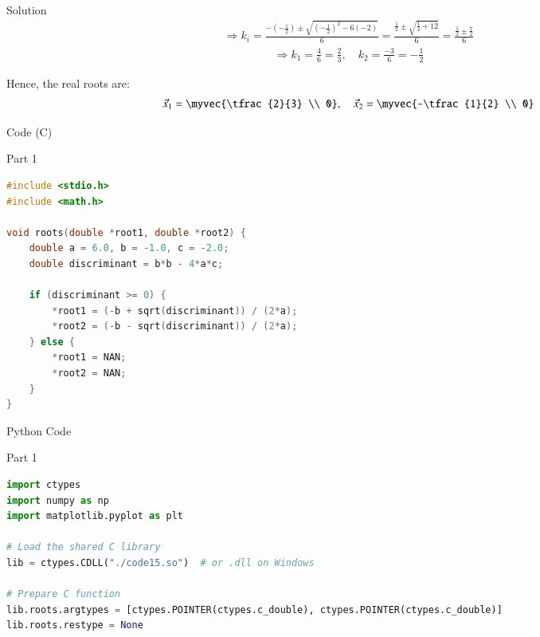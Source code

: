 \documentclass{beamer}
\begin{document}
\begin{frame}{Solution}
\begin{align}
\Rightarrow 
k_i = 
\frac{ -(-\tfrac{1}{2}) 
\pm \sqrt{ (-\tfrac{1}{2})^2 - 6(-2) } }{6}
= 
\frac{ \tfrac{1}{2} \pm \sqrt{ \tfrac{1}{4} + 12 } }{6}
= 
\frac{ \tfrac{1}{2} \pm \tfrac{7}{2} }{6}
\end{align}
\begin{align}
\Rightarrow 
k_1 = \frac{4}{6} = \frac{2}{3}, 
\quad 
k_2 = \frac{-3}{6} = -\frac{1}{2}
\end{align}

Hence, the real roots are:
\begin{align}
\vec{x}_1 = \myvec{\tfrac{2}{3} \\ 0}, 
\quad 
\vec{x}_2 = \myvec{-\tfrac{1}{2} \\ 0}
\end{align}
\end{frame}


\begin{frame}[fragile]{ Code (C)}
\begin{block}{Part 1}
\begin{lstlisting}[language=C, basicstyle=\ttfamily\small, keywordstyle=\color{blue}, frame=single]
#include <stdio.h>
#include <math.h>

void roots(double *root1, double *root2) {
    double a = 6.0, b = -1.0, c = -2.0;
    double discriminant = b*b - 4*a*c;

    if (discriminant >= 0) {
        *root1 = (-b + sqrt(discriminant)) / (2*a);
        *root2 = (-b - sqrt(discriminant)) / (2*a);
    } else {
        *root1 = NAN;
        *root2 = NAN;
    }
}
\end{lstlisting}
\end{block}
\end{frame}

\begin{frame}[fragile]{Python Code}
\begin{block}{Part 1}
\begin{lstlisting}[language=Python, basicstyle=\ttfamily\small, keywordstyle=\color{blue}, frame=single]
import ctypes
import numpy as np
import matplotlib.pyplot as plt

# Load the shared C library
lib = ctypes.CDLL("./code15.so")  # or .dll on Windows

# Prepare C function
lib.roots.argtypes = [ctypes.POINTER(ctypes.c_double), ctypes.POINTER(ctypes.c_double)]
lib.roots.restype = None

\end{lstlisting}
\end{block}
\end{frame}
\end{document}
